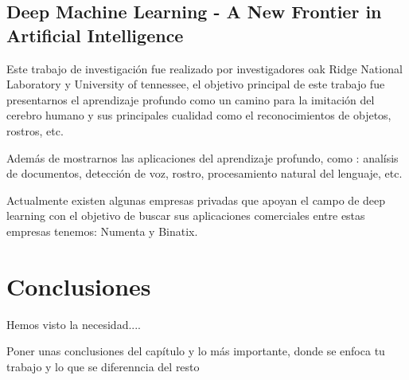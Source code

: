 \subsection{Deep Machine Learning - A New Frontier in Artificial Intelligence}
Este trabajo de investigación fue realizado por investigadores oak Ridge National Laboratory y University of tennessee, el objetivo principal de este trabajo fue presentarnos el aprendizaje profundo como un camino para la imitación del cerebro humano y sus principales cualidad como el reconocimientos de objetos, rostros, etc.

Además de mostrarnos las aplicaciones del aprendizaje profundo, como : analísis de documentos, detección de voz, rostro, procesamiento natural del lenguaje, etc.

Actualmente existen algunas empresas privadas que apoyan el campo de deep learning con el objetivo de buscar sus aplicaciones comerciales entre estas empresas tenemos: Numenta y Binatix.

\section{Conclusiones}
Hemos visto la necesidad....

Poner unas conclusiones del capítulo y lo más importante, donde se enfoca tu trabajo y lo que se diferenncia del resto

